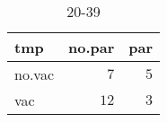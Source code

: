 %
\begin{table}[!tbp]
\caption{20-39\label{20-39}} 
\begin{center}
\begin{tabular}{lrr}
\hline\hline
\multicolumn{1}{l}{tmp}&\multicolumn{1}{c}{no.par}&\multicolumn{1}{c}{par}\tabularnewline
\hline
no.vac&$ 7$&$5$\tabularnewline
vac&$12$&$3$\tabularnewline
\hline
\end{tabular}
\end{center}
\end{table}


